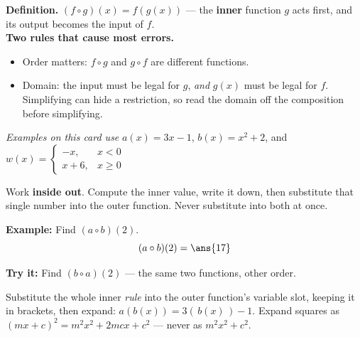 \documentclass[12pt]{article}
\begin{document}

\begin{formulabox}
\textbf{Definition.} $(f \circ g)(x) = f(g(x))$ --- the \textbf{inner} function
$g$ acts first, and its output becomes the input of $f$.\\[3pt]
\textbf{Two rules that cause most errors.}
\begin{itemize}[leftmargin=0.75cm, itemsep=1pt, topsep=1pt]
\item Order matters: $f \circ g$ and $g \circ f$ are different functions.
\item Domain: the input must be legal for $g$, \emph{and} $g(x)$ must be legal
for $f$. Simplifying can hide a restriction, so read the domain off the
composition before simplifying.
\end{itemize}
\textit{Examples on this card use} $a(x) = 3x-1$, \; $b(x) = x^2+2$, \; and
$w(x) = \begin{cases} -x, & x < 0 \\ x + 6, & x \ge 0 \end{cases}$
\end{formulabox}


\begin{formulabox}
Work \textbf{inside out}. Compute the inner value, write it down, then substitute
that single number into the outer function. Never substitute into both at once.
\end{formulabox}

\begin{examplebox}
\textbf{Example:} Find $(a \circ b)(2)$.
\[ (a \circ b)(2) = \ans{17} \]
\end{examplebox}

\begin{tryitbox}
\textbf{Try it:} Find $(b \circ a)(2)$ --- the same two functions, other order.
\\[2pt]
\end{tryitbox}


\begin{formulabox}
Substitute the whole inner \emph{rule} into the outer function's variable slot,
keeping it in brackets, then expand:
$a(b(x)) = 3(\,b(x)\,) - 1$. Expand squares as
$(mx+c)^2 = m^2x^2 + 2mcx + c^2$ --- never as $m^2x^2 + c^2$.
\end{formulabox}
\end{document}
